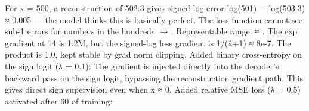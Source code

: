 {} For x = 500, a reconstruction of 502.3 gives signed-log error \markdownRendererPipe{}log(501) − log(503.3)\markdownRendererPipe{} ≈ 0.005 — the model thinks this is basically perfect. The loss function cannot see sub-1\markdownRendererPercentSign{} errors for numbers in the hundreds.\markdownRendererInterblockSeparator
{}\markdownRendererThematicBreak{}\markdownRendererInterblockSeparator
{}
\markdownRendererSectionEnd 
\markdownRendererSectionEnd \markdownRendererSectionBegin
{}\markdownRendererInterblockSeparator
{}\markdownRendererSectionBegin
{}\markdownRendererInterblockSeparator
{}  → .\markdownRendererParagraphSeparator
{}Representable range:  ≈ \markdownRendererCodeSpan{[8e-7, 1.2M]}.\markdownRendererParagraphSeparator
{} The exp gradient at 14 is \markdownRendererTilde{}1.2M, but the signed-log loss gradient is 1/(\markdownRendererPipe{}x̂\markdownRendererPipe{}+1) ≈ 8e-7. The product is \markdownRendererTilde{}1.0, kept stable by grad norm clipping.\markdownRendererInterblockSeparator
{}
\markdownRendererSectionEnd \markdownRendererSectionBegin
{}\markdownRendererInterblockSeparator
{} Added binary cross-entropy on the sign logit (λ = 0.1):\markdownRendererInterblockSeparator
{}\markdownRendererInterblockSeparator
{}The gradient  is injected directly into the decoder's backward pass on the sign logit, bypassing the reconstruction gradient path. This gives direct sign supervision even when \markdownRendererPipe{}x\markdownRendererPipe{} ≈ 0.\markdownRendererInterblockSeparator
{}
\markdownRendererSectionEnd \markdownRendererSectionBegin
{}\markdownRendererInterblockSeparator
{} Added relative MSE loss (λ = 0.5) activated after 60\markdownRendererPercentSign{} of training:\markdownRendererInterblockSeparator
{}\markdownRendererInterblockSeparator
